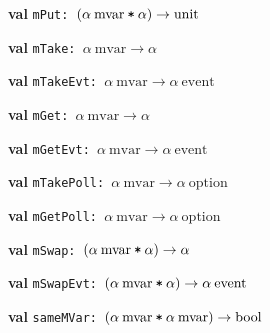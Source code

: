 \begin{interface}
\item {}{\textbf{val}} {\tt mPut: \((\alpha\:\mathrm{mvar}\:\verb,*,\:\alpha)\rightarrow \mathrm{unit}\)}

\item {}{\textbf{val}} {\tt mTake: \(\alpha\:\mathrm{mvar}\rightarrow \alpha\)}

\item {}{\textbf{val}} {\tt mTakeEvt: \(\alpha\:\mathrm{mvar}\rightarrow \alpha\:\mathrm{event}\)}

\item {}{\textbf{val}} {\tt mGet: \(\alpha\:\mathrm{mvar}\rightarrow \alpha\)}

\item {}{\textbf{val}} {\tt mGetEvt: \(\alpha\:\mathrm{mvar}\rightarrow \alpha\:\mathrm{event}\)}

\item {}{\textbf{val}} {\tt mTakePoll: \(\alpha\:\mathrm{mvar}\rightarrow \alpha\:\mathrm{option}\)}

\item {}{\textbf{val}} {\tt mGetPoll: \(\alpha\:\mathrm{mvar}\rightarrow \alpha\:\mathrm{option}\)}

\item {}{\textbf{val}} {\tt mSwap: \((\alpha\:\mathrm{mvar}\:\verb,*,\:\alpha)\rightarrow \alpha\)}

\item {}{\textbf{val}} {\tt mSwapEvt: \((\alpha\:\mathrm{mvar}\:\verb,*,\:\alpha)\rightarrow \alpha\:\mathrm{event}\)}

\item {}{\textbf{val}} {\tt sameMVar: \((\alpha\:\mathrm{mvar}\:\verb,*,\:\alpha\:\mathrm{mvar})\rightarrow \mathrm{bool}\)}

\end{interface}


